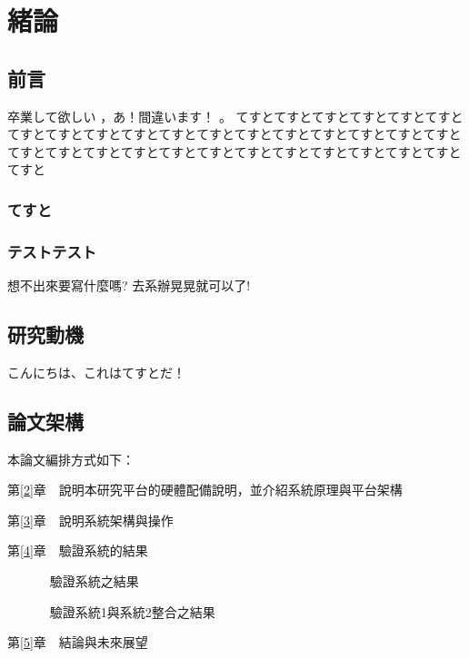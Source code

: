 
\chapter{緒論}\label{1}


\section{前言}\label{1-1}
卒業して欲しい \cite{m1} ，あ！間違います！ \cite{talbot97} 。
てすとてすとてすとてすとてすとてすとてすとてすとてすとてすとてすとてすとてすとてすとてすとてすとてすとてすとてすとてすとてすとてすとてすとてすとてすとてすとてすとてすとてすとてすとてすと

\subsection{てすと}


\subsection{テストテスト}
想不出來要寫什麼嗎?
去系辦晃晃就可以了!

\newpage

\section{研究動機}\label{1-2}
こんにちは、これはてすとだ！

\newpage

\section{論文架構}\label{1-3}

\n 本論文編排方式如下：

第\ref{2}章　說明本研究平台的硬體配備說明，並介紹系統原理與平台架構

第\ref{3}章　說明系統架構與操作

第\ref{4}章　驗證系統的結果
		
　　　      驗證系統之結果

　　　      驗證系統1與系統2整合之結果

第\ref{5}章　結論與未來展望
